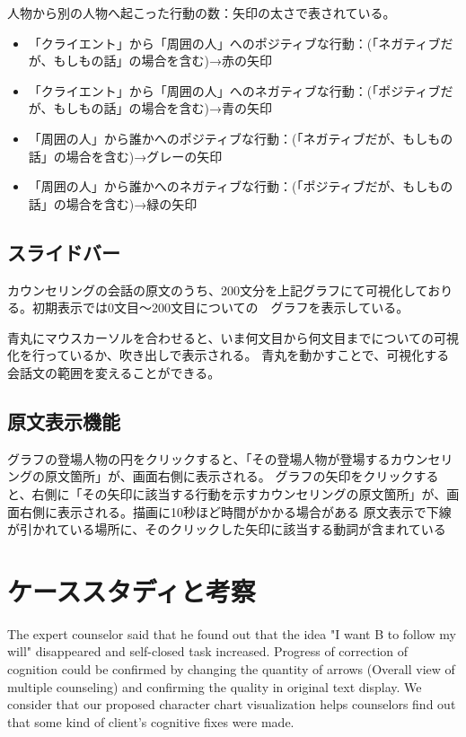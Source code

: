 \documentclass[shuuron]{kuee}
\begin{document}
人物から別の人物へ起こった行動の数：矢印の太さで表されている。


\begin{itemize}
\item 「クライエント」から「周囲の人」へのポジティブな行動：(「ネガティブだが、もしもの話」の場合を含む)→赤の矢印
\item 「クライエント」から「周囲の人」へのネガティブな行動：(「ポジティブだが、もしもの話」の場合を含む)→青の矢印
\item 「周囲の人」から誰かへのポジティブな行動：(「ネガティブだが、もしもの話」の場合を含む)→グレーの矢印
\item 「周囲の人」から誰かへのネガティブな行動：(「ポジティブだが、もしもの話」の場合を含む)→緑の矢印
\end{itemize}








\subsection{スライドバー}

カウンセリングの会話の原文のうち、200文分を上記グラフにて可視化しておりる。初期表示では0文目〜200文目についての　グラフを表示している。

青丸にマウスカーソルを合わせると、いま何文目から何文目までについての可視化を行っているか、吹き出しで表示される。
青丸を動かすことで、可視化する会話文の範囲を変えることができる。


\subsection{原文表示機能}

グラフの登場人物の円をクリックすると、「その登場人物が登場するカウンセリングの原文箇所」が、画面右側に表示される。
グラフの矢印をクリックすると、右側に「その矢印に該当する行動を示すカウンセリングの原文箇所」が、画面右側に表示される。描画に10秒ほど時間がかかる場合がある
原文表示で下線が引かれている場所に、そのクリックした矢印に該当する動詞が含まれている




\section{ケーススタディと考察}

  The expert counselor said that he found out that the idea "I want B to follow my will" disappeared and self-closed task increased. Progress of correction of cognition could be confirmed by changing the quantity of arrows (Overall view of multiple counseling) and confirming the quality in original text display. We consider that our proposed character chart visualization helps counselors find out that some kind of client's cognitive fixes were made.
\end{document}
